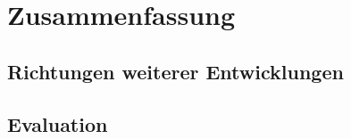 \documentclass[12pt,a4paper,ngerman]{article}
\begin{document}
\section{Zusammenfassung}

\subsection{Richtungen weiterer Entwicklungen}

\subsection{Evaluation}

\newpage

\appendix

\printbibliography

\newpage

\listoffigures

\newpage
\end{document}
